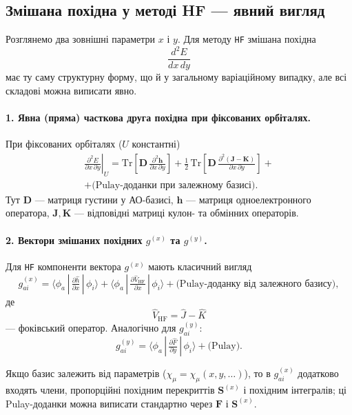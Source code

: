 \subsection{Змішана похідна у методі HF — явний вигляд}

Розглянемо два зовнішні параметри $x$ і $y$. Для методу \texttt{HF} змішана похідна
\[
	\frac{d^2E}{dx\,dy}
\]
має ту саму структурну форму, що й у загальному варіаційному випадку, але всі складові можна виписати явно.

\paragraph{1. Явна (пряма) часткова друга похідна при фіксованих орбіталях.}
При фіксованих орбіталях ($U$ константні)
\begin{multline}\label{eq:explicit_partial_xy}
	\left.\frac{\partial^2 E}{\partial x\,\partial y}\right|_{U}
	=
	\mathrm{Tr}\!\left[\mathbf D\,\frac{\partial^2\mathbf h}{\partial x\,\partial y}\right]
	+\tfrac12\,\mathrm{Tr}\!\left[\mathbf D\,\frac{\partial^2(\mathbf J-\mathbf K)}{\partial x\,\partial y}\right]
	+ \\ + \text{(Pulay-доданки при залежному базисі)}.
\end{multline}
Тут $\mathbf D$ — матриця густини у АО-базисі, $\mathbf h$ — матриця одноелектронного оператора, $\mathbf J,\mathbf K$ — відповідні матриці кулон- та обмінних операторів.

\paragraph{2. Вектори змішаних похідних \(g^{(x)}\) та \(g^{(y)}\).}
Для \texttt{HF} компоненти вектора $g^{(x)}$ мають класичний вигляд
\begin{equation}\label{eq:g_ai_HF_explicit}
	g^{(x)}_{ai}
	=
	\langle \phi_a \,|\, \tfrac{\partial\hat h}{\partial x} \,|\, \phi_i \rangle
	+
	\langle \phi_a \,|\, \tfrac{\partial\hat V_{\mathrm{HF}}}{\partial x} \,|\, \phi_i \rangle
	+
	\text{(Pulay-доданку від залежного базису)},
\end{equation}
де
\[
	\hat V_{\mathrm{HF}} = \hat J - \hat K
\]
— фоківський оператор. Аналогічно для $g^{(y)}_{ai}$:
\[
	g^{(y)}_{ai}
	=
	\langle \phi_a \,|\, \tfrac{\partial\hat F}{\partial y} \,|\, \phi_i \rangle
	+ \text{(Pulay)}.
\]

Якщо базис залежить від параметрів ($\chi_\mu=\chi_\mu(x,y,\dots)$), то в $g^{(x)}_{ai}$ додатково входять члени, пропорційні похідним перекриттів $\mathbf S^{(x)}$ і похідним інтегралів; ці Pulay-доданки можна виписати стандартно через $\mathbf F$ і $\mathbf S^{(x)}$.



